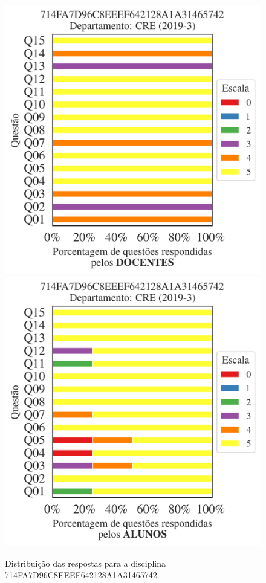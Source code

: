 \documentclass[a4paper,10pt]{article}
\begin{document}
\begin{figure}[h]
\centering
\includegraphics[width=0.485\linewidth]{analise_disciplina_departamento_CRE_714FA7D96C8EEEF642128A1A31465742_docentes.png}
\includegraphics[width=0.485\linewidth]{analise_disciplina_departamento_CRE_714FA7D96C8EEEF642128A1A31465742_alunos.png}
\caption{\label{fig:analise_geral_departamento}                Distribuição das respostas para a disciplina 714FA7D96C8EEEF642128A1A31465742. }
\end{figure}
\end{document}
